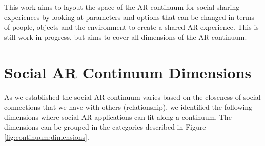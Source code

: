  


This work aims to layout the space of the AR continuum for social sharing experiences by looking at parameters and options that can be changed in terms of people, objects and the environment to create a shared AR experience. This is still work in progress, but aims to cover all dimensions of the AR continuum.

\section{Social AR Continuum Dimensions}

As we established the social AR continuum varies based on the closeness of social connections that we have with others (relationship), we identified the following dimensions where social AR applications can fit along a continuum. The dimensions can be grouped in the categories described in Figure \ref{fig:continuum:dimensions}.

